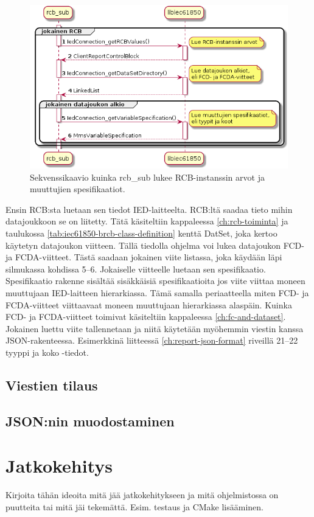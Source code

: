 \begin{figure}[ht!]
	\includegraphics[width=1\textwidth]{pictures/rcb-sub-reading-specifications.png}
	\caption{Sekvenssikaavio kuinka rcb\_sub lukee RCB-instanssin arvot ja muuttujien spesifikaatiot.}
	\label{fig:rcb-sub-reading-specifications}
\end{figure}

Ensin RCB:sta luetaan sen tiedot IED-laitteelta. RCB:ltä saadaa tieto mihin datajoukkoon se on liitetty. Tätä käsiteltiin kappaleessa \ref{ch:rcb-toiminta} ja taulukossa \ref{tab:iec61850-brcb-class-definition} kenttä DatSet, joka kertoo käytetyn datajoukon viitteen. Tällä tiedolla ohjelma voi lukea datajoukon FCD- ja FCDA-viitteet. Tästä saadaan jokainen viite listassa, joka käydään läpi silmukassa kohdissa 5--6. Jokaiselle viitteelle luetaan sen spesifikaatio. Spesifikaatio rakenne sisältää sisäkkäisiä spesifikaatioita jos viite viittaa moneen muuttujaan IED-laitteen hierarkiassa. Tämä samalla periaatteella miten FCD- ja FCDA-viitteet viittaavaat moneen muuttujaan hierarkiassa alaspäin. Kuinka FCD- ja FCDA-viitteet toimivat käsiteltiin kappaleessa \ref{ch:fc-and-dataset}. Jokainen luettu viite tallennetaan ja niitä käytetään myöhemmin viestin kanssa JSON-rakenteessa. Esimerkkinä liitteessä \ref{ch:report-json-format} riveillä 21--22 tyyppi ja koko -tiedot.


\subsection{Viestien tilaus}


\subsection{JSON:nin muodostaminen}


\section{Jatkokehitys}
\begin{it}
	Kirjoita tähän ideoita mitä jää jatkokehitykseen ja mitä ohjelmistossa on puutteita tai mitä jäi tekemättä. Esim. testaus ja CMake lisääminen.
\end{it}